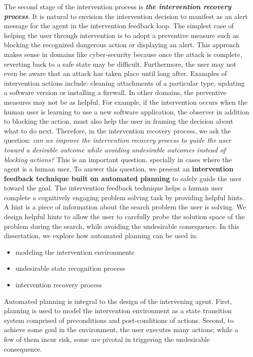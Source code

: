 The second stage of the intervention process is \textit{\textbf{the intervention recovery process}}. 
It is natural to envision the intervention decision to manifest as an alert message for the agent in the intervention feedback loop. 
The simplest case of helping the user through intervention is to adopt a preventive measure such as blocking the recognized dangerous action or displaying an alert.
This approach makes sense in domains like cyber-security because once the attack is complete, reverting back to a safe state may be difficult. 
Furthermore, the user may not even be aware that an attack has taken place until long after. 
Examples of intervention actions include: cleaning attachments of a particular type, updating a software version or installing a firewall. 
In other domains, the preventive measures may not be as helpful. 
For example, if the intervention occurs when the human user is learning to use a new software application, the observer in addition to blocking the action, must also help the user in framing the decision about what to do next.
Therefore, in the intervention recovery process, we ask the question: \textit{can we improve the intervention recovery process to guide the user toward a desirable outcome while avoiding undesirable outcomes instead of blocking actions?} 
This is an important question, specially in cases where the agent is a human user. 
To answer this question, we present an \textbf{intervention feedback technique built on automated planning} to safely guide the user toward the goal.
The intervention feedback technique helps a human user complete a cognitively engaging problem solving task by providing helpful hints. 
A hint is a piece of information about the search problem the user is solving. 
We design helpful hints to allow the user to carefully probe the solution space of the problem during the search, while avoiding the undesirable consequence.
In this dissertation, we explore how automated planning can be used in:
\begin{itemize}
\item modeling the intervention environments
\item undesirable state recognition process
\item intervention recovery process
\end{itemize}
Automated planning is integral to the design of the intervening agent. 
First, planning is used to model the intervention environment as a state transition system comprised of preconditions and post-conditions of actions. 
Second, to achieve some goal in the environment, the user executes many actions; while a few of them incur risk, some are pivotal in triggering the undesirable consequence. 
